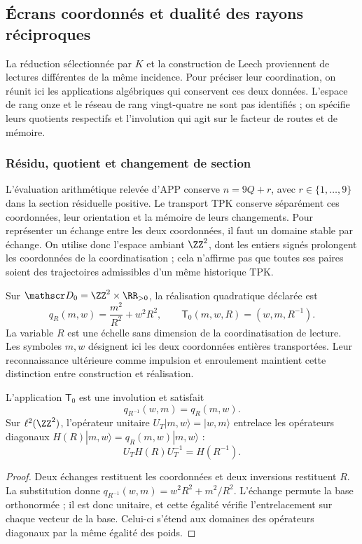 \subsection{Écrans coordonnés et dualité des rayons réciproques}
\label{exc:pantallas-dualidad}

La réduction sélectionnée par \(K\) et la construction de Leech
proviennent de lectures différentes de la même incidence. Pour préciser
leur coordination, on réunit ici les applications algébriques qui conservent
ces deux données. L'espace de rang onze et le réseau de rang vingt-quatre
ne sont pas identifiés ; on spécifie leurs quotients respectifs et
l'involution qui agit sur le facteur de routes et de mémoire.

\subsubsection{Résidu, quotient et changement de section}

L'évaluation arithmétique relevée d'APP conserve
\(n=9Q+r\), avec \(r\in\{1,\ldots,9\}\) dans la section
résiduelle positive. Le transport TPK conserve séparément ces
coordonnées, leur orientation et la mémoire de leurs changements. Pour
représenter un échange entre les deux coordonnées, il faut
un domaine stable par échange. On utilise donc l'espace ambiant
\(\ZZ^2\), dont les entiers signés prolongent les coordonnées de
la coordinatisation ; cela n'affirme pas que toutes ses paires soient des trajectoires
admissibles d'un même historique TPK.

Sur \(\mathscr D_0=\ZZ^2\times\RR_{>0}\), la réalisation quadratique
déclarée est
\begin{equation}
 q_R(m,w)=\frac{m^2}{R^2}+w^2R^2,
 \qquad \mathsf T_0(m,w,R)=(w,m,R^{-1}).
 \label{eq:dualidad-normalizada-k}
\end{equation}
La variable \(R\) est une échelle sans dimension de la coordinatisation de lecture.
Les symboles \(m,w\) désignent ici les deux coordonnées entières
transportées. Leur reconnaissance ultérieure comme impulsion et enroulement
maintient cette distinction entre construction et réalisation.

\begin{proposition}
\label{prop:dualidad-radios-k}
L'application \(\mathsf T_0\) est une involution et satisfait
\[
 q_{R^{-1}}(w,m)=q_R(m,w).
\]
Sur \(\ell^2(\ZZ^2)\), l'opérateur unitaire
\(U_T|m,w\rangle=|w,m\rangle\) entrelace les opérateurs
diagonaux \(H(R)|m,w\rangle=q_R(m,w)|m,w\rangle\) :
\[
 U_TH(R)U_T^{-1}=H(R^{-1}).
\]
\end{proposition}
\begin{proof}
Deux échanges restituent les coordonnées et deux inversions restituent
\(R\). La substitution donne
\(q_{R^{-1}}(w,m)=w^2R^2+m^2/R^2\). L'échange permute
la base orthonormée ; il est donc unitaire, et cette égalité vérifie
l'entrelacement sur chaque vecteur de la base. Celui-ci s'étend aux
domaines des opérateurs diagonaux par la même égalité des poids.
\end{proof}

